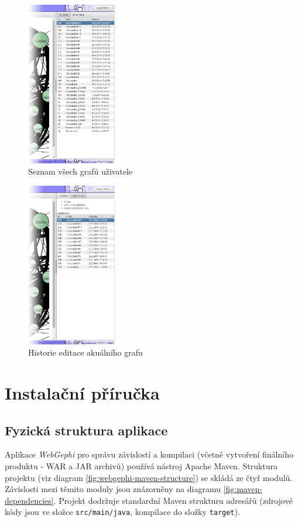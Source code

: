 \documentclass[thesis=M,czech]{FITthesis}[2014/05/6]
\begin{document}
\begin{figure}\centering
 	\includegraphics[width=0.35\textwidth]{images/prtsc/clientapp-09-graphs_list}
 	\caption[Seznam všech grafů uživatele]{Seznam všech grafů uživatele}\label{fig:clientapp-09-graphs_list}
\end{figure}
\begin{figure}\centering
 	\includegraphics[width=0.35\textwidth]{images/prtsc/clientapp-08-history}
 	\caption[Historie editace akuálního grafu]{Historie editace akuálního grafu}\label{fig:clientapp-08-history}
\end{figure}

\chapter{Instalační příručka}
\section{Fyzická struktura aplikace}
Aplikace \textit{WebGephi} pro správu závislostí a kompilaci (včetně vytvoření finálního produktu - WAR a JAR archivů) používá nástroj Apache Maven\cite{maven}.
Struktura projektu (viz diagram \ref{fig:webgephi-maven-structure}) se skládá ze čtyř modulů. Závislosti mezi těmito moduly jsou znázorněny  na diagramu \ref{fig:maven-dependencies}.
Projekt dodržuje standardní Maven strukturu adresářů (zdrojové kódy jsou ve složce \texttt{src/main/java}, kompilace do složky \texttt{target}).
\end{document}
